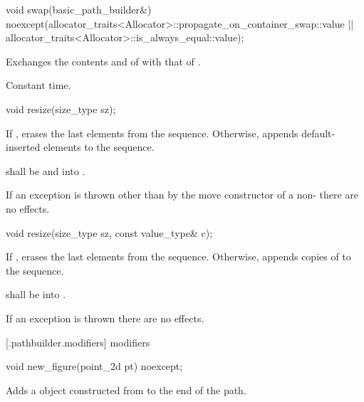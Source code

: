 %
\begin{itemdecl}
void swap(basic_path_builder&)
  noexcept(allocator_traits<Allocator>::propagate_on_container_swap::value ||
  allocator_traits<Allocator>::is_always_equal::value);
\end{itemdecl}
\begin{itemdescr}
\pnum
\effects
Exchanges the contents and
of
with that of .

\pnum
\complexity
Constant time.
\end{itemdescr}

%
\begin{itemdecl}
void resize(size_type sz);
\end{itemdecl}
\begin{itemdescr}
\pnum
\effects
If , erases the last  elements
from the sequence. Otherwise, appends  default-inserted 
elements to the sequence.

\pnum
\requires
{} shall be
 and  into .

\pnum
\remarks
If an exception is thrown other than by the move constructor of a 
non-
 there are no effects.
\end{itemdescr}

%
\begin{itemdecl}
void resize(size_type sz, const value_type& c);
\end{itemdecl}
\begin{itemdescr}
\pnum
\effects
If , erases the last  elements
from the sequence. Otherwise,
appends  copies of  to the sequence.

\pnum
\requires
{} shall be  into .

\pnum
\remarks
If an exception is thrown there are no effects.
\end{itemdescr}

 [\iotwod.pathbuilder.modifiers] { modifiers}

%
\begin{itemdecl}
void new_figure(point_2d pt) noexcept;
\end{itemdecl}
\begin{itemdescr}
\pnum
\effects
Adds a  object constructed from  to the end of the path.
\end{itemdescr}

